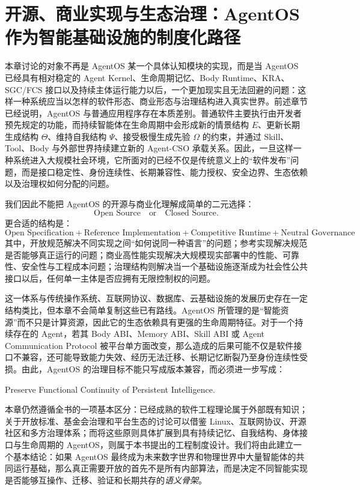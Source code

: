 \chapter{开源、商业实现与生态治理：AgentOS 作为智能基础设施的制度化路径}

\begin{chapterlead}
本章讨论的对象不再是 AgentOS 某一个具体认知模块的实现，而是当 AgentOS 已经具有相对稳定的 Agent Kernel、生命周期记忆、Body Runtime、KRA、SGC/FCS 接口以及持续主体运行能力以后，一个更加现实且无法回避的问题：这样一种系统应当以怎样的软件形态、商业形态与治理结构进入真实世界。前述章节已经说明，AgentOS 与普通应用程序存在本质差别。普通软件主要执行由开发者预先规定的功能，而持续智能体在生命周期中会形成新的情景结构 $E$、更新长期生成结构 $\Theta$、维持自我结构 $\Psi$、接受极慢生成先验 $\Omega$ 的约束，并通过 Skill、Tool、Body 与外部世界持续建立新的 Agent-CSO 承载关系。因此，一旦这样一种系统进入大规模社会环境，它所面对的已经不仅是传统意义上的``软件发布''问题，而是接口稳定性、身份连续性、长期兼容性、能力授权、安全边界、生态依赖以及治理权如何分配的问题。

我们因此不能把 AgentOS 的开源与商业化理解成简单的二元选择：
\[
\text{Open Source}
\quad \text{or} \quad
\text{Closed Source}.
\]
更合适的结构是：
\[
\boxed{
\text{Open Specification}
+
\text{Reference Implementation}
+
\text{Competitive Runtime}
+
\text{Neutral Governance}
}
\]
其中，开放规范解决不同实现之间``如何说同一种语言''的问题；参考实现解决规范是否能够真正运行的问题；商业高性能实现解决大规模现实部署中的性能、可靠性、安全性与工程成本问题；治理结构则解决当一个基础设施逐渐成为社会性公共接口以后，任何单一主体是否应拥有无限控制权的问题。

这一体系与传统操作系统、互联网协议、数据库、云基础设施的发展历史存在一定结构类比，但本章不会简单复制这些已有路线。AgentOS 所管理的是``智能资源''而不只是计算资源，因此它的生态依赖具有更强的生命周期特征。对于一个持续存在的 Agent，若其 Body ABI、Memory ABI、Skill ABI 或 Agent Communication Protocol 被平台单方面改变，那么造成的后果可能不仅是软件接口不兼容，还可能导致能力失效、经历无法迁移、长期记忆断裂乃至身份连续性受损。由此，AgentOS 的治理目标不能只写成版本兼容，而必须进一步写成：
\begin{statementbox}
Preserve Functional Continuity of Persistent Intelligence.
\end{statementbox}

本章仍然遵循全书的一项基本区分：已经成熟的软件工程理论属于外部既有知识；关于开放标准、基金会治理和平台生态的讨论可以借鉴 Linux、互联网协议、开源社区和多方治理体系；而将这些原则具体扩展到具有持续记忆、自我结构、身体接口与生命周期的 AgentOS，则属于本书提出的工程制度设计。我们将由此建立一个基本结论：如果 AgentOS 最终成为未来数字世界和物理世界中大量智能体的共同运行基础，那么真正需要开放的首先不是所有内部算法，而是决定不同智能实现是否能够互操作、迁移、验证和长期共存的\emph{语义骨架}。
\end{chapterlead}

